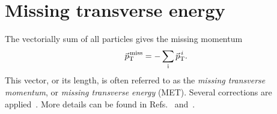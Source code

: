 \section{Missing transverse energy}\label{sec:met}



The vectorially sum of all particles gives the missing momentum
\begin{equation} \label{eq:MET}
  {\vec{\mkern0mup}}_{\mathrm{T}}^{\kern1pt\text{miss}} = - \sum_{\text{i}}\vec{\mkern0mup}_\text{T}^{\,i}.
\end{equation}
This vector, or its length, is often referred to as the \emph{missing transverse momentum}, or \emph{missing transverse energy} (MET).
Several corrections are applied~\cite{PF2017}.
More details can be found in Refs.~\cite{CMS-PAS-JME-16-004} and~\cite{CMS-PAS-JME-17-001}. 

